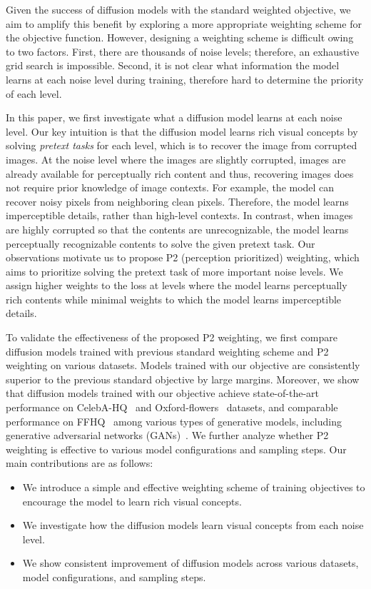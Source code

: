 Given the success of diffusion models with the standard weighted objective, we aim to amplify this benefit by exploring a more appropriate weighting scheme for the objective function. However, designing a weighting scheme is difficult owing to two factors. First, there are thousands of noise levels; therefore, an exhaustive grid search is impossible. Second, it is not clear what information the model learns at each noise level during training, therefore hard to determine the priority of each level.


In this paper, we first investigate what a diffusion model learns at each noise level. Our key intuition is that the diffusion model learns rich visual concepts by solving \textit{pretext tasks} for each level, which is to recover the image from corrupted images. At the noise level where the images are slightly corrupted, images are already available for perceptually rich content and thus, recovering images does not require prior knowledge of image contexts. For example, the model can recover noisy pixels from neighboring clean pixels. Therefore, the model learns imperceptible details, rather than high-level contexts. In contrast, when images are highly corrupted so that the contents are unrecognizable, the model learns perceptually recognizable contents to solve the given pretext task. Our observations motivate us to propose P2 (perception prioritized) weighting, which aims to prioritize solving the pretext task of more important noise levels. We assign higher weights to the loss at levels where the model learns perceptually rich contents while minimal weights to which the model learns imperceptible details.


To validate the effectiveness of the proposed P2 weighting, we first compare diffusion models trained with previous standard weighting scheme and P2 weighting on various datasets. Models trained with our objective are consistently superior to the previous standard objective by large margins. Moreover, we show that diffusion models trained with our objective achieve state-of-the-art performance on CelebA-HQ~\cite{karras2017progressive} and Oxford-flowers~\cite{nilsback2008automated} datasets, and comparable performance on FFHQ~\cite{stylegan} among various types of generative models, including generative adversarial networks (GANs)~\cite{goodfellow2014generative}. We further analyze whether P2 weighting is effective to various model configurations and sampling steps. Our main contributions are as follows:

\begin{itemize}

\item We introduce a simple and effective weighting scheme of training objectives to encourage the model to learn rich visual concepts. 

\item We investigate how the diffusion models learn visual concepts from each noise level.

\item We show consistent improvement of diffusion models across various datasets, model configurations, and sampling steps.
\end{itemize}


